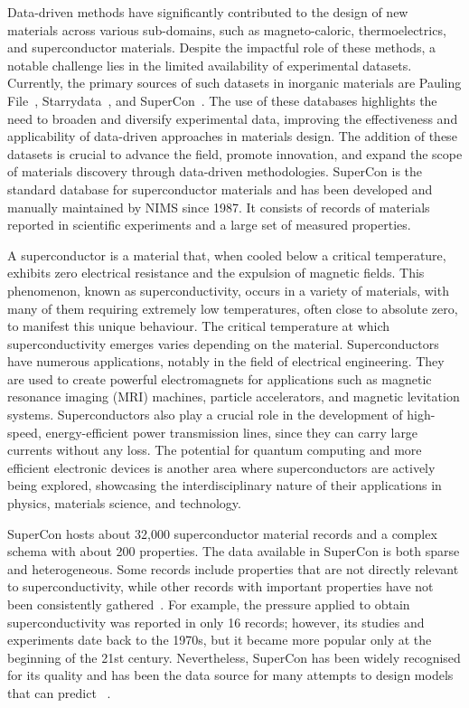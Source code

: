 Data-driven methods have significantly contributed to the design of new materials across various sub-domains, such as magneto-caloric, thermoelectrics, and superconductor materials. Despite the impactful role of these methods, a notable challenge lies in the limited availability of experimental datasets. 
Currently, the primary sources of such datasets in inorganic materials are Pauling File~\cite{Blokhin2018ThePF_paulingFile}, Starrydata~\cite{katsura2019data}, and SuperCon~\cite{ishii2023structuring}. 
The use of these databases highlights the need to broaden and diversify experimental data, improving the effectiveness and applicability of data-driven approaches in materials design. The addition of these datasets is crucial to advance the field, promote innovation, and expand the scope of materials discovery through data-driven methodologies.
SuperCon is the standard database for superconductor materials and has been developed and manually maintained by NIMS since 1987. 
It consists of records of materials reported in scientific experiments and a large set of measured properties. 

A superconductor is a material that, when cooled below a critical temperature, exhibits zero electrical resistance and the expulsion of magnetic fields. This phenomenon, known as superconductivity, occurs in a variety of materials, with many of them requiring extremely low temperatures, often close to absolute zero, to manifest this unique behaviour. The critical temperature at which superconductivity emerges varies depending on the material. 
Superconductors have numerous applications, notably in the field of electrical engineering. They are used to create powerful electromagnets for applications such as magnetic resonance imaging (MRI) machines, particle accelerators, and magnetic levitation systems. 
Superconductors also play a crucial role in the development of high-speed, energy-efficient power transmission lines, since they can carry large currents without any loss. The potential for quantum computing and more efficient electronic devices is another area where superconductors are actively being explored, showcasing the interdisciplinary nature of their applications in physics, materials science, and technology.

SuperCon hosts about 32,000 superconductor material records and a complex schema with about 200 properties. 
The data available in SuperCon is both sparse and heterogeneous. Some records include properties that are not directly relevant to superconductivity, while other records with important properties have not been consistently gathered~\cite{sommer20223dsc}.
For example, the pressure applied to obtain superconductivity was reported in only 16 records; however, its studies and experiments date back to the 1970s, but it became more popular only at the beginning of the 21st century.  
Nevertheless, SuperCon has been widely recognised for its quality and has been the data source for many attempts to design models that can predict \tc~\cite{stanev2017machine, le2020critical, Hamlin2019SuperconductivityNR}. 

